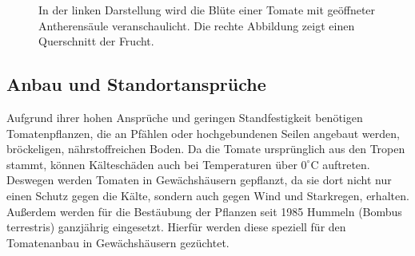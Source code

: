 \begin{figure}[h!]
	\hfill
	\hfill
	\hfill
	\caption{In der linken Darstellung wird die Blüte einer Tomate mit geöffneter Antherensäule veranschaulicht. Die rechte Abbildung zeigt einen Querschnitt der Frucht\cite{nutzpflanzen}.}
	\label{tomaten_both}
\end{figure}


\subsection{Anbau und Standortansprüche}



Aufgrund ihrer hohen Ansprüche und geringen Standfestigkeit benötigen Tomatenpflanzen, die an Pfählen oder hochgebundenen Seilen angebaut werden, bröckeligen, nährstoffreichen Boden. Da die Tomate ursprünglich aus den Tropen stammt\cite{nutzpflanzen}, können Kälteschäden auch bei Temperaturen über $0^\circ\text{C}$ auftreten. Deswegen werden Tomaten in Gewächshäusern gepflanzt, da sie dort nicht nur einen Schutz gegen die Kälte, sondern auch gegen Wind und Starkregen, erhalten. Außerdem werden für die Bestäubung der Pflanzen seit 1985 Hummeln (Bombus terrestris) ganzjährig eingesetzt. Hierfür werden diese speziell für den Tomatenanbau in Gewächshäusern gezüchtet.

